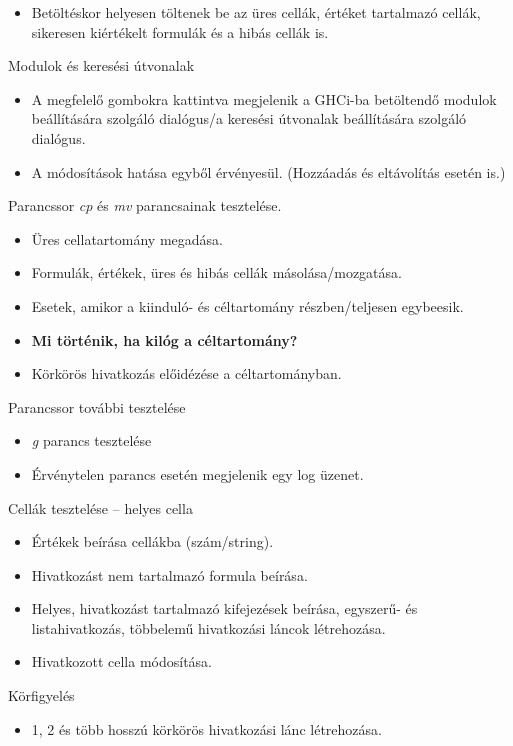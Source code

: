 \begin{compactenum}
\begin{itemize}
		\item Betöltéskor helyesen töltenek be az üres cellák, értéket tartalmazó cellák, sikeresen kiértékelt formulák és a hibás cellák is. 
	\end{itemize}
	\item Modulok és keresési útvonalak
	\begin{itemize}
		\item A megfelelő gombokra kattintva megjelenik a GHCi-ba betöltendő modulok beállítására szolgáló dialógus/a keresési útvonalak beállítására szolgáló dialógus.
		\item A módosítások hatása egyből érvényesül. (Hozzáadás és eltávolítás esetén is.)
	\end{itemize}	
	\item Parancssor \textit{cp} és \textit{mv} parancsainak tesztelése. 	
	\begin{itemize}
		\item Üres cellatartomány megadása.
		\item Formulák, értékek, üres és hibás cellák másolása/mozgatása.
		\item Esetek, amikor a kiinduló- és céltartomány részben/teljesen egybeesik.
		\item \textbf{Mi történik, ha kilóg a céltartomány?}
		\item Körkörös hivatkozás előidézése a céltartományban.
	\end{itemize}
	\item Parancssor további tesztelése
	\begin{itemize}
		\item \textit{g} parancs tesztelése
		\item Érvénytelen parancs esetén megjelenik egy log üzenet.
	\end{itemize}
	\item Cellák tesztelése -- helyes cella
	\begin{itemize}
		\item Értékek beírása cellákba (szám/string).
		\item Hivatkozást nem tartalmazó formula beírása.
		\item Helyes, hivatkozást tartalmazó kifejezések beírása, egyszerű- és listahivatkozás, többelemű hivatkozási láncok létrehozása.
		\item Hivatkozott cella módosítása.
	\end{itemize}
	\item Körfigyelés
	\begin{itemize}
		\item 1, 2 és több hosszú körkörös hivatkozási lánc létrehozása.

\end{itemize}
\end{compactenum}

